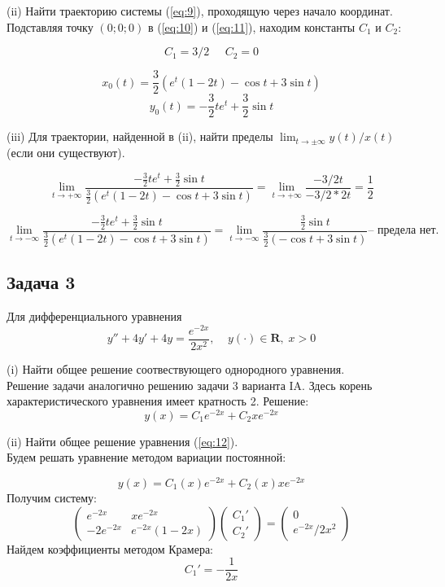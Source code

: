 \documentclass[a4paper, 12pt]{article}
\begin{document}
(ii) Найти траекторию системы (\ref{eq:9}), проходящую через начало координат.\\
Подставляя точку $(0;0;0)$ в (\ref{eq:10}) и (\ref{eq:11}), находим константы $C_1$ и $C_2$:

\[C_1 =3/2\;\;\;\;\; C_2 = 0\]

\[
x_0(t) = \frac 3 2 ( e^t\left(1-2t\right)-  \cos{t}+3\sin{t})\]\[
y_0(t) = - \frac 3 2 te^t+ \frac 3 2 \sin{t}
\]

(iii) Для траектории, найденной в (ii), найти пределы $\lim_{t\rightarrow\pm\infty}y(t)/x(t)$ (если они существуют).


\[\lim_{t\rightarrow+\infty}\frac{- \frac 3 2 te^t+ \frac 3 2 \sin{t}}{\frac 3 2 ( e^t\left(1-2t\right)-  \cos{t}+3\sin{t})}= \lim_{t\rightarrow+\infty}\frac{-3/2t}{-3/2 *2t}=\frac 1 2 \]

\[\lim_{t\rightarrow-\infty}\frac{- \frac 3 2 te^t+ \frac 3 2 \sin{t}}{\frac 3 2 ( e^t\left(1-2t\right)-  \cos{t}+3\sin{t})}=\lim_{t\rightarrow-\infty}\frac{ \frac 3 2 \sin{t}}{\frac 3 2 ( -  \cos{t}+3\sin{t})} \textbf{--  предела нет.}\]


	\subsection {Задача 3}
Для дифференциального уравнения 
\begin{equation}
y''+4y'+4y=\frac{e^{-2x}}{2x^2}, \;\;\;\; y(\cdot)\in \textbf{R},\; x>0
\label{eq:12}
\end{equation}

(i) Найти общее решение соотвествующего однородного уравнения.\\
Решение задачи аналогично решению задачи 3 варианта IA. Здесь корень характеристического уравнения имеет кратность 2. Решение:
\[y(x) = C_1e^{-2x}+C_2xe^{-2x}\]

(ii) Найти общее решение уравнения (\ref{eq:12}).\\
Будем решать уравнение методом вариации постоянной:

\[y(x)= C_1(x)e^{-2x}+C_2(x)xe^{-2x}\]
Получим систему:
\[ \left(
\begin{array}{cc}
e^{-2x} & xe^{-2x} \\
-2e^{-2x} & e^{-2x}(1-2x)
\end{array}
\right) \left(
\begin{array}{c}
C_1' \\
C_2'
\end{array} 
\right)= \left(
\begin{array}{c}
0 \\
e^{-2x}/2x^2
\end{array}
\right) \]
Найдем коэффициенты методом Крамера:
\[C_1' = -\frac 1 {2x}\]
\end{document}
